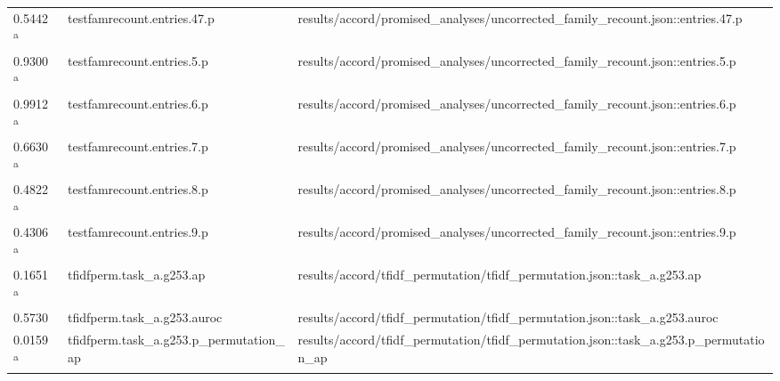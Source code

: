 \begin{longtable}{@{}p{0.7in}p{1.9in}p{2.6in}@{}}
0.5442 \textsuperscript{a} & testfamrecount.\allowbreak{}entries.\allowbreak{}47.\allowbreak{}p & results/\allowbreak{}accord/\allowbreak{}promised\_analyses/\allowbreak{}uncorrected\_family\_recount.\allowbreak{}json::entries.\allowbreak{}47.\allowbreak{}p\\
0.9300 \textsuperscript{a} & testfamrecount.\allowbreak{}entries.\allowbreak{}5.\allowbreak{}p & results/\allowbreak{}accord/\allowbreak{}promised\_analyses/\allowbreak{}uncorrected\_family\_recount.\allowbreak{}json::entries.\allowbreak{}5.\allowbreak{}p\\
0.9912 \textsuperscript{a} & testfamrecount.\allowbreak{}entries.\allowbreak{}6.\allowbreak{}p & results/\allowbreak{}accord/\allowbreak{}promised\_analyses/\allowbreak{}uncorrected\_family\_recount.\allowbreak{}json::entries.\allowbreak{}6.\allowbreak{}p\\
0.6630 \textsuperscript{a} & testfamrecount.\allowbreak{}entries.\allowbreak{}7.\allowbreak{}p & results/\allowbreak{}accord/\allowbreak{}promised\_analyses/\allowbreak{}uncorrected\_family\_recount.\allowbreak{}json::entries.\allowbreak{}7.\allowbreak{}p\\
0.4822 \textsuperscript{a} & testfamrecount.\allowbreak{}entries.\allowbreak{}8.\allowbreak{}p & results/\allowbreak{}accord/\allowbreak{}promised\_analyses/\allowbreak{}uncorrected\_family\_recount.\allowbreak{}json::entries.\allowbreak{}8.\allowbreak{}p\\
0.4306 \textsuperscript{a} & testfamrecount.\allowbreak{}entries.\allowbreak{}9.\allowbreak{}p & results/\allowbreak{}accord/\allowbreak{}promised\_analyses/\allowbreak{}uncorrected\_family\_recount.\allowbreak{}json::entries.\allowbreak{}9.\allowbreak{}p\\
0.1651 \textsuperscript{a} & tfidfperm.\allowbreak{}task\_a.\allowbreak{}g253.\allowbreak{}ap & results/\allowbreak{}accord/\allowbreak{}tfidf\_permutation/\allowbreak{}tfidf\_permutation.\allowbreak{}json::task\_a.\allowbreak{}g253.\allowbreak{}ap\\
0.5730 & tfidfperm.\allowbreak{}task\_a.\allowbreak{}g253.\allowbreak{}auroc & results/\allowbreak{}accord/\allowbreak{}tfidf\_permutation/\allowbreak{}tfidf\_permutation.\allowbreak{}json::task\_a.\allowbreak{}g253.\allowbreak{}auroc\\
0.0159 \textsuperscript{a} & tfidfperm.\allowbreak{}task\_a.\allowbreak{}g253.\allowbreak{}p\_permutation\_ap & results/\allowbreak{}accord/\allowbreak{}tfidf\_permutation/\allowbreak{}tfidf\_permutation.\allowbreak{}json::task\_a.\allowbreak{}g253.\allowbreak{}p\_permutation\_ap\\

\end{longtable}
